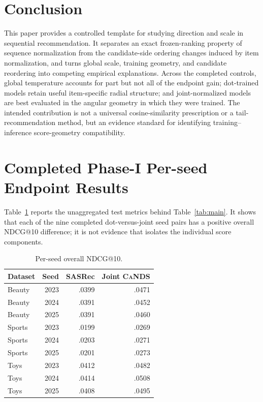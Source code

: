 \documentclass[sigconf,anonymous,review]{acmart}
\newcommand{\cands}{\textsc{CaNDS}}
\begin{document}
\section{Conclusion}
This paper provides a controlled template for studying direction and scale in sequential recommendation. It separates an exact frozen-ranking property of sequence normalization from the candidate-side ordering changes induced by item normalization, and turns global scale, training geometry, and candidate reordering into competing empirical explanations. Across the completed controls, global temperature accounts for part but not all of the endpoint gain; dot-trained models retain useful item-specific radial structure; and joint-normalized models are best evaluated in the angular geometry in which they were trained. The intended contribution is not a universal cosine-similarity prescription or a tail-recommendation method, but an evidence standard for identifying training--inference score-geometry compatibility.

\clearpage
\appendix
\section{Completed Phase-I Per-seed Endpoint Results}
Table~\ref{tab:perseed} reports the unaggregated test metrics behind Table~\ref{tab:main}. It shows that each of the nine completed dot-versus-joint seed pairs has a positive overall NDCG@10 difference; it is not evidence that isolates the individual score components.
\begin{table}[H]\caption{Per-seed overall NDCG@10.}\label{tab:perseed}\centering\scriptsize
\begin{tabular}{lrrr}\toprule Dataset&Seed&SASRec&Joint \cands{}\\\midrule
Beauty&2023&.0399&.0471\\Beauty&2024&.0391&.0452\\Beauty&2025&.0391&.0460\\
Sports&2023&.0199&.0269\\Sports&2024&.0203&.0271\\Sports&2025&.0201&.0273\\
Toys&2023&.0412&.0482\\Toys&2024&.0414&.0508\\Toys&2025&.0408&.0495\\\bottomrule
\end{tabular}\end{table}
\end{document}

